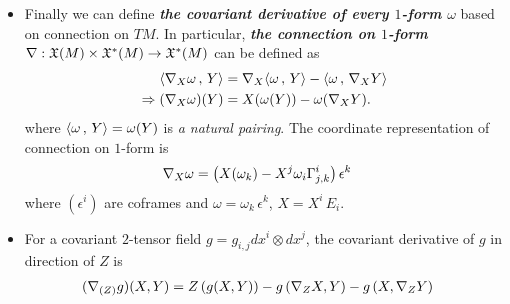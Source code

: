 \documentclass[11pt]{article}
\begin{document}
\begin{itemize}
\item \begin{remark}
Finally we can define \emph{\textbf{the covariant derivative of every $1$-form $\omega$}} based on connection on $TM$. In particular, \emph{\textbf{the connection on $1$-form}} $\nabla: {\mathfrak X}(M) \times {\mathfrak X}^{*}(M) \rightarrow {\mathfrak X}^{*}(M)$ can be defined as 
\begin{align} 
\left\langle \nabla_{X}{\omega}\,,\, Y \right\rangle &= \nabla_{X}{\left\langle \omega\,,\, Y \right\rangle} - \left\langle \omega\,,\, \nabla_{X}{Y} \right\rangle \nonumber\\
\Rightarrow (\nabla_{X}{\omega})(Y)&= X(\omega(Y)) - \omega(\nabla_{X}{Y}). \label{eqn: connections_1_form}
\end{align} where $\left\langle \omega\,,\, Y \right\rangle = \omega(Y)$ is \emph{a natural pairing}. The coordinate representation of connection on $1$-form is
\begin{align}
\nabla_{X}{\omega} &= \left(X(\omega_k) - X^{j}\omega_{i}\Gamma_{j,k}^{i}\right)\epsilon^{k}  \label{eqn: connection_1_form_coordinate}
\end{align} where $(\epsilon^i)$ are coframes and $\omega = \omega_k\,\epsilon^k$, $X = X^i\,E_i$.
\end{remark}

\item \begin{remark}
For a covariant $2$-tensor field $g= g_{i,j} dx^i \otimes dx^j$, the covariant derivative of $g$ in direction of $Z$ is
\begin{align*}
(\nabla_{(Z)}{g})(X, Y) &= Z\left(g(X, Y)\right) - g\left(\nabla_{Z}{X}, Y\right) - g\left(X, \nabla_{Z}{Y}\right)
\end{align*}
\end{remark}
\end{itemize}
\end{document}
